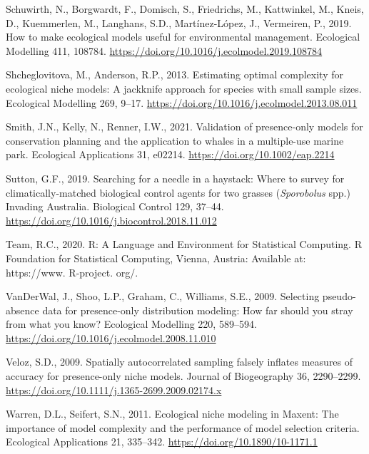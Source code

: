 \documentclass[12pt,]{article}
\begin{document}
\begin{CSLReferences}{1}{0}
\leavevmode\hypertarget{ref-Schuwirth2019}{}%
Schuwirth, N., Borgwardt, F., Domisch, S., Friedrichs, M., Kattwinkel,
M., Kneis, D., Kuemmerlen, M., Langhans, S.D., Martínez-López, J.,
Vermeiren, P., 2019. How to make ecological models useful for
environmental management. Ecological Modelling 411, 108784.
\url{https://doi.org/10.1016/j.ecolmodel.2019.108784}

\leavevmode\hypertarget{ref-Shcheglovitova2013}{}%
Shcheglovitova, M., Anderson, R.P., 2013. Estimating optimal complexity
for ecological niche models: {A} jackknife approach for species with
small sample sizes. Ecological Modelling 269, 9--17.
\url{https://doi.org/10.1016/j.ecolmodel.2013.08.011}

\leavevmode\hypertarget{ref-Smith2021}{}%
Smith, J.N., Kelly, N., Renner, I.W., 2021. Validation of presence-only
models for conservation planning and the application to whales in a
multiple-use marine park. Ecological Applications 31, e02214.
\url{https://doi.org/10.1002/eap.2214}

\leavevmode\hypertarget{ref-Sutton2019b}{}%
Sutton, G.F., 2019. Searching for a needle in a haystack: {Where} to
survey for climatically-matched biological control agents for two
grasses ({\emph{Sporobolus}} spp.) Invading {Australia}. Biological
Control 129, 37--44.
\url{https://doi.org/10.1016/j.biocontrol.2018.11.012}

\leavevmode\hypertarget{ref-RCoreTeam2020}{}%
Team, R.C., 2020. R: A Language and Environment for Statistical
Computing. R Foundation for Statistical Computing, Vienna, Austria:
Available at: https://www. R-project. org/.

\leavevmode\hypertarget{ref-VanDerWal2009}{}%
VanDerWal, J., Shoo, L.P., Graham, C., Williams, S.E., 2009. Selecting
pseudo-absence data for presence-only distribution modeling: {How} far
should you stray from what you know? Ecological Modelling 220, 589--594.
\url{https://doi.org/10.1016/j.ecolmodel.2008.11.010}

\leavevmode\hypertarget{ref-Veloz2009}{}%
Veloz, S.D., 2009. Spatially autocorrelated sampling falsely inflates
measures of accuracy for presence-only niche models. Journal of
Biogeography 36, 2290--2299.
\url{https://doi.org/10.1111/j.1365-2699.2009.02174.x}

\leavevmode\hypertarget{ref-Warren2011}{}%
Warren, D.L., Seifert, S.N., 2011. Ecological niche modeling in
{Maxent}: The importance of model complexity and the performance of
model selection criteria. Ecological Applications 21, 335--342.
\url{https://doi.org/10.1890/10-1171.1}


\end{CSLReferences}
\end{document}
